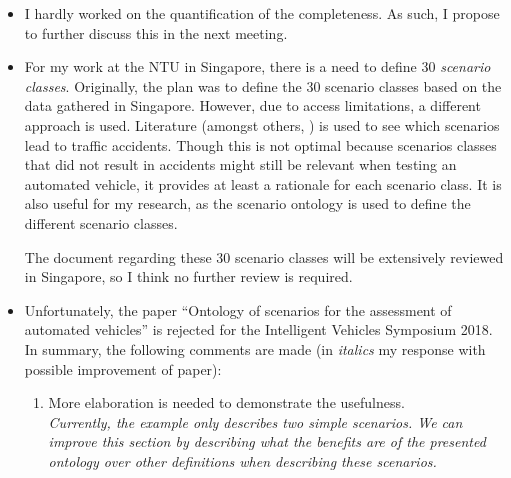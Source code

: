 \documentclass[10pt,final,a4paper,oneside,onecolumn]{article}
\begin{document}
\begin{itemize}
	\item I hardly worked on the quantification of the completeness. As such, I propose to further discuss this in the next meeting.
	
	\item For my work at the NTU in Singapore, there is a need to define 30 \emph{scenario classes}. Originally, the plan was to define the 30 scenario classes based on the data gathered in Singapore. However, due to access limitations, a different approach is used. Literature (amongst others, \cite{USDoT2007precrashscenarios, opdencamp2014cats, adaptive2017d73}) is used to see which scenarios lead to traffic accidents. Though this is not optimal because scenarios classes that did not result in accidents might still be relevant when testing an automated vehicle, it provides at least a rationale for each scenario class. It is also useful for my research, as the scenario ontology is used to define the different scenario classes.
	
	The document regarding these 30 scenario classes will be extensively reviewed in Singapore, so I think no further review is required.
	
	\item Unfortunately, the paper ``Ontology of scenarios for the assessment of automated vehicles'' is rejected for the Intelligent Vehicles Symposium 2018. In summary, the following comments are made (in \textit{italics} my response with possible improvement of paper):
	\begin{enumerate}
		\item More elaboration is needed to demonstrate the usefulness.\\
		\textit{Currently, the example only describes two simple scenarios. We can improve this section by describing what the benefits are of the presented ontology over other definitions \cite{geyer2014, ulbrich2015, elrofai2016scenario} when describing these scenarios.}
		

\end{enumerate}
\end{itemize}
\end{document}

